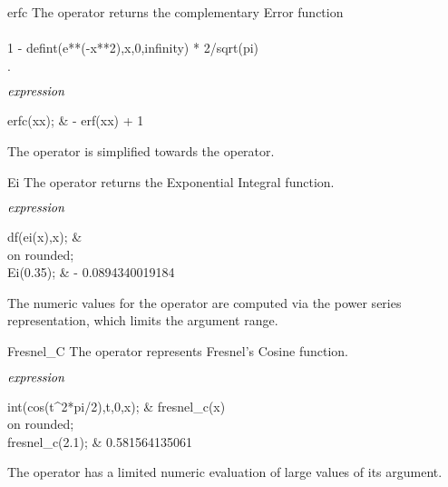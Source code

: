 \begin{Operator}{erfc}
The  operator returns the complementary Error function\\
 \\
  1 - defint(e**(-x**2),x,0,infinity) * 2/sqrt(pi) \\
.\\
\begin{Syntax}
\(\meta{expression}\)
\end{Syntax}

\begin{Examples}
erfc(xx);                     &      - erf(xx) + 1
\end{Examples}

\begin{Comments}
The operator  is simplified towards the  operator.
\end{Comments}
\end{Operator}

\begin{Operator}{Ei}
The  operator returns the Exponential Integral function.

\begin{Syntax}
\(\meta{expression}\)
\end{Syntax}

\begin{Examples}
df(ei(x),x);               &   \\
on rounded; \\
Ei(0.35);                  &    - 0.0894340019184
\end{Examples}

\begin{Comments}
The numeric values for the operator  are computed via the
power series representation, which limits the argument range.
\end{Comments}
\end{Operator}

\begin{Operator}{Fresnel_C}
The  operator represents Fresnel's Cosine function.

\begin{Syntax}
\(\meta{expression}\)
\end{Syntax}

\begin{Examples}
int(cos(t^2*pi/2),t,0,x);     &   fresnel\_c(x) \\
on rounded; \\
fresnel_c(2.1);                  &   0.581564135061
\end{Examples}

\begin{Comments}
The operator  has a limited numeric evaluation of 
large values of its argument.
\end{Comments}
\end{Operator}

